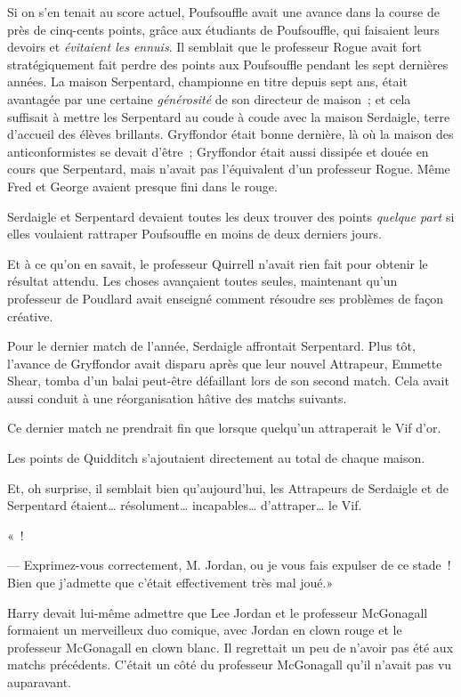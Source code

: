 Si on s'en tenait au score actuel, Poufsouffle avait une avance dans la course de près de cinq-cents points, grâce aux étudiants de Poufsouffle, qui faisaient leurs devoirs et \emph{évitaient les ennuis}. Il semblait que le professeur Rogue avait fort stratégiquement fait perdre des points aux Poufsouffle pendant les sept dernières années. La maison Serpentard, championne en titre depuis sept ans, était avantagée par une certaine \emph{générosité} de son directeur de maison~; et cela suffisait à mettre les Serpentard au coude à coude avec la maison Serdaigle, terre d'accueil des élèves brillants. Gryffondor était bonne dernière, là où la maison des anticonformistes se devait d'être~; Gryffondor était aussi dissipée et douée en cours que Serpentard, mais n'avait pas l'équivalent d'un professeur Rogue. Même Fred et George avaient presque fini dans le rouge.

Serdaigle et Serpentard devaient toutes les deux trouver des points \emph{quelque part} si elles voulaient rattraper Poufsouffle en moins de deux derniers jours.

Et à ce qu'on en savait, le professeur Quirrell n'avait rien fait pour obtenir le résultat attendu. Les choses avançaient toutes seules, maintenant qu'un professeur de Poudlard avait enseigné comment résoudre ses problèmes de façon créative.

Pour le dernier match de l'année, Serdaigle affrontait Serpentard. Plus tôt, l'avance de Gryffondor avait disparu après que leur nouvel Attrapeur, Emmette Shear, tomba d'un balai peut-être défaillant lors de son second match. Cela avait aussi conduit à une réorganisation hâtive des matchs suivants.

Ce dernier match ne prendrait fin que lorsque quelqu'un attraperait le Vif d'or.

Les points de Quidditch s'ajoutaient directement au total de chaque maison.

Et, oh surprise, il semblait bien qu'aujourd'hui, les Attrapeurs de Serdaigle et de Serpentard étaient… résolument… incapables… d'attraper… le Vif.

«~!

--- Exprimez-vous correctement, M. Jordan, ou je vous fais expulser de ce stade~! Bien que j'admette que c'était effectivement très mal joué.»

Harry devait lui-même admettre que Lee Jordan et le professeur McGonagall formaient un merveilleux duo comique, avec Jordan en clown rouge et le professeur McGonagall en clown blanc. Il regrettait un peu de n'avoir pas été aux matchs précédents. C'était un côté du professeur McGonagall qu'il n'avait pas vu auparavant.

